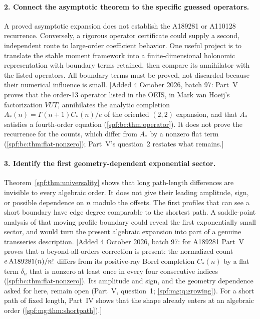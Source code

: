 \documentclass[11pt]{article}
\numberwithin{equation}{section}
\theoremstyle{definition}
\theoremstyle{remark}
\theoremstyle{definition}
\newcommand{\Aone}{\textnormal{A189281}}
\newcommand{\bcC}{C_{\!*}}
\newcommand{\bcA}{A_{\!*}}
\begin{document}
\paragraph{2. Connect the asymptotic theorem to the specific guessed operators.}
A proved asymptotic expansion does not establish the A189281 or A110128
recurrence. Conversely, a rigorous operator certificate could supply a second,
independent route to large-order coefficient behavior. One useful project is
to translate the stable moment framework into a finite-dimensional holonomic
representation with boundary terms retained, then compare its annihilator
with the listed operators. All boundary terms must be proved, not discarded
because their numerical influence is small.
[Added 4 October 2026, batch 97: Part~V proves that the order-13 operator
listed in the OEIS, in Mark van Hoeij's factorization $VUT$, annihilates the
analytic completion $\bcA(n)=\Gamma(n+1)\bcC(n)/e$ of the oriented $(2,2)$
expansion, and that $\bcA$ satisfies a fourth-order equation
(\cref{spf:bc:thm:operator}). It does not prove the recurrence for the
counts, which differ from $\bcA$ by a nonzero flat term
(\cref{spf:bc:thm:flat-nonzero}); Part~V's question~2 restates what
remains.]

\paragraph{3. Identify the first geometry-dependent exponential sector.}
Theorem~\ref{spf:thm:universality} shows that long path-length differences are
invisible to every algebraic order. It does not give their leading amplitude,
sign, or possible dependence on $n$ modulo the offsets. The first profiles
that can see a short boundary have edge degree comparable to the shortest
path. A saddle-point analysis of that moving profile boundary could reveal
the first exponentially small sector, and would turn the present algebraic
expansion into part of a genuine transseries description.
[Added 4 October 2026, batch 97: for A189281 Part~V proves that a
beyond-all-orders correction is present: the normalized count
$e\,\Aone(n)/n!$ differs from its positive-ray Borel completion $\bcC(n)$ by a
flat term $\delta_n$ that is nonzero at least once in every four consecutive
indices (\cref{spf:bc:thm:flat-nonzero}). Its amplitude and sign, and the
geometry dependence asked for here, remain open (Part~V, question~1;
\cref{spf:mg:q:growing}). For a short path of fixed length, Part~IV shows
that the shape already enters at an algebraic order
(\cref{spf:mg:thm:shortpath}).]
\end{document}
